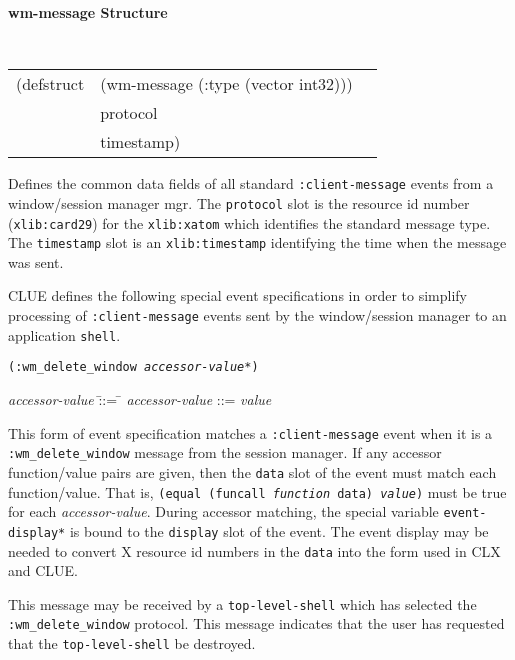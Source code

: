 {\samepage
{\large {\bf wm-message \hfill Structure}} 
\begin{flushright} 
\parbox[t]{6.125in}{
\tt
\begin{tabular}{lll}
(defstruct & (wm-message (:type (vector int32))) \\
           & protocol \\
           & timestamp)\\
\end{tabular}
\rm

}\end{flushright}}

\begin{flushright} \parbox[t]{6.125in}{
Defines the common data fields of all standard {\tt :client-message} events from
a window/session manager mgr. The {\tt protocol} slot is 
the resource id number ({\tt xlib:card29}) for the {\tt xlib:xatom} which
identifies the
standard message type. The {\tt timestamp} slot is an {\tt xlib:timestamp}
identifying the time when the message was sent.

}\end{flushright}



CLUE defines the following special event specifications  in order to simplify processing
of {\tt :client-message} events sent by the window/session manager to an
application {\tt shell}.

\pagebreak
{\samepage
{}
{\tt (:wm\_delete\_window {\em accessor-value}*)}\\
\hspace*{.75in}
\parbox[t]{5.75in}{
\begin{tabbing}
{\em accessor-value} \= ::= \= \kill
{\em accessor-value} \>::=  {\em value} \\
\end{tabbing}}
}
\begin{flushright}
\parbox[t]{5.75in}{
This
form of event specification matches a {\tt :client-message}
event when it is a {\tt :wm\_delete\_window} message from the session manager.
If
any accessor function/value pairs are
given, then the {\tt data} slot of the event must
match each function/value. That is, {\tt (equal (funcall {\em function}
data) {\em value})} must be true for each {\em accessor-value}.
During accessor matching, the special variable {\tt *event-display*} is
bound to the {\tt display} slot of the event. The event display may be
needed to convert X resource id numbers in the {\tt data} into the form
used in CLX and CLUE.}

\parbox[t]{5.75in}{
This message may be received by a {\tt top-level-shell} which has selected the 
{\tt :wm\_delete\_window} protocol. This message indicates that the user has
requested that the {\tt top-level-shell} be destroyed.}
\end{flushright}

